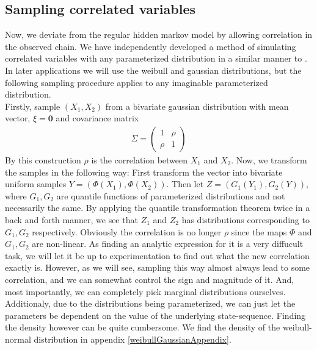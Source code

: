\subsection{Sampling correlated variables}\label{correlatedVariables}
Now, we deviate from the regular hidden markov model by allowing correlation in the observed chain. We have independently developed a method of simulating correlated variables with any parameterized distribution in a similar manner to \cite{thomasWard}. In later applications we will use the weibull and gaussian distributions, but the following sampling procedure applies to any imaginable parameterized distribution.\\ Firstly, sample $(X_1, X_2)$ from a bivariate gaussian distribution with mean vector, $\xi = \mathbf{0}$ and covariance matrix 
\begin{align}\Sigma = \begin{pmatrix}
    1 & \rho \\
    \rho & 1
\end{pmatrix}
\end{align}
By this construction $\rho$ is the correlation between $X_1$ and $X_2$. Now, we transform the samples in the following way: First transform the vector into bivariate uniform samples $Y = (\Phi(X_1),\Phi(X_2))$. Then let $Z = (G_1(Y_1), G_2(Y))$, where $G_1, G_2$ are quantile functions of parameterized distributions and not necessarily the same. By applying the quantile transformation theorem twice in a back and forth manner, we see that $Z_1$ and $Z_2$ has distributions corresponding to $G_1, G_2$ respectively. Obviously the correlation is no longer $\rho$ since the maps $\Phi$ and $G_1, G_2$ are non-linear. As finding an analytic expression for it is a very diffucult task, we will let it be up to experimentation to find out what the new correlation exactly is. However, as we will see, sampling this way almost always lead to some correlation, and we can somewhat control the sign and magnitude of it. And, most importantly, we can completely pick marginal distributions ourselves. Additionaly, due to the distributions being parameterized, we can just let the parameters be dependent on the value of the underlying state-sequence. Finding the density however can be quite cumbersome. We find the density of the weibull-normal distribution in appendix \ref{weibullGaussianAppendix}.